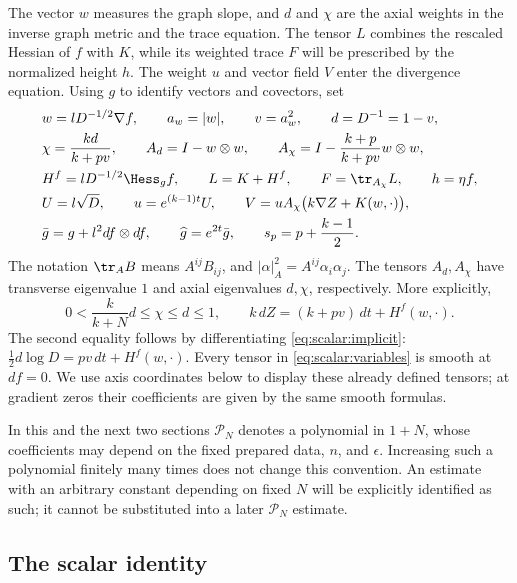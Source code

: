 The vector $w$ measures the graph slope, and $d$ and $\chi$ are the
axial weights in the inverse graph metric and the trace equation.
The tensor $L$ combines the rescaled Hessian of $f$ with $K$, while its weighted trace
$F$ will be prescribed by the normalized height $h$.  The weight $u$
and vector field $V$ enter the divergence equation.  Using $g$ to
identify vectors and covectors, set
\begin{equation}
 \begin{aligned}
 &w=lD^{-1/2}\nabla f,\qquad a_w=|w|,\qquad v=a_w^2,\qquad d=D^{-1}=1-v,\\
 &\chi=\frac{kd}{k+pv},\qquad
 A_d=I-w\otimes w,\qquad
 A_\chi=I-\frac{k+p}{k+pv}w\otimes w,\\
 &H^f=lD^{-1/2}\Hess_g f,\qquad L=K+H^f,\qquad
 F=\tr_{A_\chi}L,\qquad h=\eta f,\\
 &U=l\sqrt D,\qquad u=e^{(k-1)t}U,\qquad
 V=uA_\chi\bigl(k\nabla Z+K(w,\cdot)\bigr),\\
 &\bar g=g+l^2df\otimes df,\qquad \widehat g=e^{2t}\bar g,
 \qquad s_p=p+\frac{k-1}{2}.
 \end{aligned}
 \label{eq:scalar:variables}
\end{equation}
The notation $\tr_A B$ means $A^{ij}B_{ij}$, and
$|\alpha|_A^2=A^{ij}\alpha_i\alpha_j$.  The tensors $A_d,A_\chi$
have transverse eigenvalue $1$ and axial eigenvalues $d,\chi$,
respectively.  More explicitly,
\begin{equation}
 0<\frac{k}{k+N}d\leq\chi\leq d\leq1,
 \qquad
 k\,dZ=(k+pv)\,dt+H^f(w,\cdot).
 \label{eq:scalar:differential}
\end{equation}
The second equality follows by differentiating
\eqref{eq:scalar:implicit}:
$\tfrac12d\log D=pv\,dt+H^f(w,\cdot)$.
Every tensor in \eqref{eq:scalar:variables} is smooth at $df=0$.
We use axis coordinates below to display these already defined tensors;
at gradient zeros their coefficients are given by the same smooth
formulas.

In this and the next two sections $\mathcal P_N$ denotes a polynomial
in $1+N$, whose coefficients may depend on the fixed prepared data,
$n$, and $\epsilon$.  Increasing such a polynomial finitely many times
does not change this convention.  An estimate with an arbitrary
constant depending on fixed $N$ will be explicitly identified as such;
it cannot be substituted into a later $\mathcal P_N$ estimate.

\subsection{The scalar identity}

